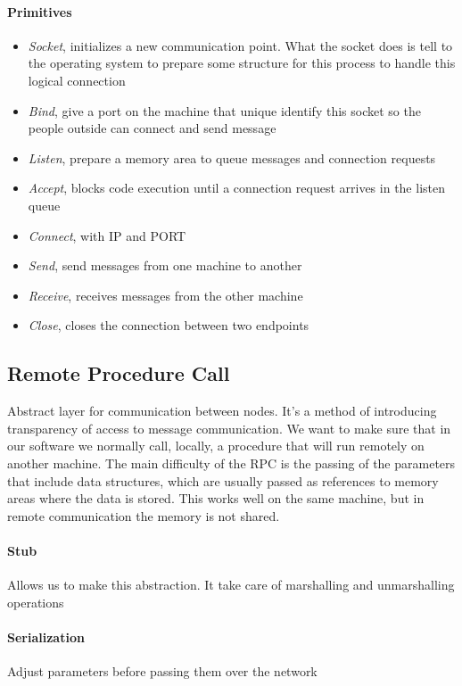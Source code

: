 \paragraph{Primitives}
\begin{itemize}
    \item \textit{Socket}, initializes a new communication point. What the socket does is tell to the operating system to prepare some structure for this process to handle this logical connection
    \item \textit{Bind}, give a port on the machine that unique identify this socket so the people outside can connect and send message
    \item \textit{Listen}, prepare a memory area to queue messages and connection requests
    \item \textit{Accept}, blocks code execution until a connection request arrives in the listen queue
    \item \textit{Connect}, with IP and PORT
    \item \textit{Send}, send messages from one machine to another
    \item \textit{Receive}, receives messages from the other machine 
    \item \textit{Close}, closes the connection between two endpoints
\end{itemize}

\subsection{Remote Procedure Call}
Abstract layer for communication between nodes. It’s a method of introducing transparency of access to message communication. We want to make sure that in our software we normally call, locally, a procedure that will run remotely on another machine. The main difficulty of the RPC is the passing of the parameters that include data structures, which are usually passed as references to memory areas where the data is stored. This works well on the same machine, but in remote communication the memory is not shared.

\paragraph{Stub}
Allows us to make this abstraction. It take care of marshalling and unmarshalling operations

\paragraph{Serialization}
Adjust parameters before passing them over the network

